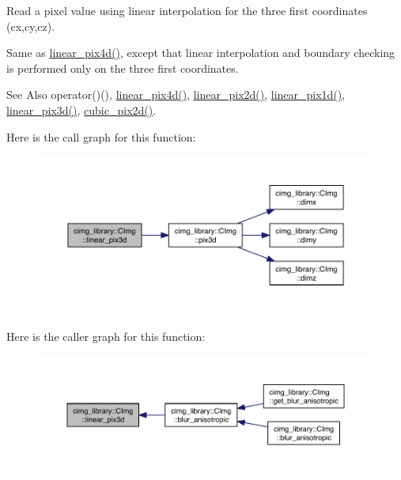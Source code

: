 Read a pixel value using linear interpolation for the three first coordinates ({\ttfamily cx},{\ttfamily cy},{\ttfamily cz}). 


\begin{DoxyItemize}
\item Same as \hyperlink{structcimg__library_1_1_c_img_ad201bbecc0caabbe566ea7507cd657cf}{linear\-\_\-pix4d()}, except that linear interpolation and boundary checking is performed only on the three first coordinates.
\end{DoxyItemize}

\begin{DoxySeeAlso}{See Also}
operator()(), \hyperlink{structcimg__library_1_1_c_img_ad201bbecc0caabbe566ea7507cd657cf}{linear\-\_\-pix4d()}, \hyperlink{structcimg__library_1_1_c_img_a94e74f9969caf1db1f862ec9c145ed29}{linear\-\_\-pix2d()}, \hyperlink{structcimg__library_1_1_c_img_a510052a861eff8b05a02ba2f4427ed62}{linear\-\_\-pix1d()}, \hyperlink{structcimg__library_1_1_c_img_a99af7b06c856fffc82a8872f2ebd5e8c}{linear\-\_\-pix3d()}, \hyperlink{structcimg__library_1_1_c_img_ab26403a66e670b53ef8f706fe83247a7}{cubic\-\_\-pix2d()}. 
\end{DoxySeeAlso}


Here is the call graph for this function\-:
\nopagebreak
\begin{figure}[H]
\begin{center}
\leavevmode
\includegraphics[width=350pt]{structcimg__library_1_1_c_img_a99af7b06c856fffc82a8872f2ebd5e8c_cgraph}
\end{center}
\end{figure}




Here is the caller graph for this function\-:
\nopagebreak
\begin{figure}[H]
\begin{center}
\leavevmode
\includegraphics[width=350pt]{structcimg__library_1_1_c_img_a99af7b06c856fffc82a8872f2ebd5e8c_icgraph}
\end{center}
\end{figure}


